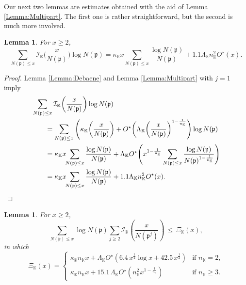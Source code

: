 \documentclass[10pt,reqno]{amsart}
\theoremstyle{plain}
\newtheorem{lemma}[theorem]{Lemma}
\theoremstyle{definition}
\newcommand{\K}{\mathbb{K}}
\newcommand{\PP}{\mathfrak{p}}
\newcommand{\I}{\mathcal{I}}
\begin{document}
Our next two lemmas are estimates obtained with the aid of Lemma \ref{Lemma:Multipart}.
The first one is rather straightforward, but the second is much more involved.

\begin{lemma}\label{Lemma:FirstPower}
For $x\geq2$,
\begin{equation*}
\sum_{N(\PP)\leq x} \I_{\K} \bigg(\frac{x}{N(\PP)}\bigg) \log{N(\PP)} 
= \kappa_{\K} x \sum_{N(\PP)\leq x} \frac{\log{N(\PP)}}{N(\PP)} 
+ 1.1 \Lambda_{\K}n_{\K}^2 O^{\star} (x) .
\end{equation*}
\end{lemma}

\begin{proof}
Lemma \ref{Lemma:Debaene} and Lemma \ref{Lemma:Multipart} with $j  = 1$ imply
\begin{align*}
&\sum_{N(\PP)\leq x} \I_{\K} \bigg(\frac{x}{N(\PP)}\bigg) \log{N(\PP)}\\
&\qquad= \sum_{N(\PP)\leq x} \Bigg( \kappa_{\K}  \bigg(\frac{x}{N(\PP)}\bigg) 
+ O^{\star}\bigg(\Lambda_{\K} \bigg(\frac{x}{N(\PP)}\bigg)^{1-\frac{1}{n_{\K}}} \Bigg) \log N(\PP)  \\
&\qquad= \kappa_{\K} x \!\!  \sum_{N(\PP)\leq x} \frac{\log{N(\PP)}}{N(\PP)} 
+ \Lambda_{\K} O^{\star}\Bigg(x^{1 - \frac{1}{n_{\K}}}\sum_{N(\PP)\leq x}  
\frac{ \log N(\PP)}{N(\PP)^{1-\frac{1}{n_{\K}}} } \Bigg)  \\
&\qquad= \kappa_{\K} x \!\!  \sum_{N(\PP)\leq x} \frac{\log{N(\PP)}}{N(\PP)} 
+ 1.1 \Lambda_{\K}n_{\K}^2 O^{\star} (x)  .\qedhere
\end{align*}
\end{proof}


\begin{lemma}\label{Lemma:HigherPowers}
For $x\geq 2$,
\begin{equation*}
\sum_{N(\PP)\leq x} \log{N(\PP)} \sum_{j\geq 2} \I_{\K} \left(\frac{x}{N(\PP^j)}\right) 
\,\leq\, \Xi_{\K}(x),
\end{equation*}
in which
\begin{equation}\label{eq:Xi}
\Xi_{\K}(x)=
\begin{cases}
\kappa_{\K} n_{\K} x + \Lambda_{\K} O^{\star}( 6.4\,x^{ \frac{1}{2} }\log x +42.5\,x^{\frac{1}{2}}  )  & \text{if $n_{\K} = 2$}, \\[5pt]
\kappa_{\K} n_{\K} x + 15.1 \,\Lambda_{\K} O^{\star}( n_{\K}^2 x^{1 - \frac{1}{n_{\K}}}  )  & \text{if $n_{\K} \geq 3$}. 
\end{cases}
\end{equation}
\end{lemma}
\end{document}
